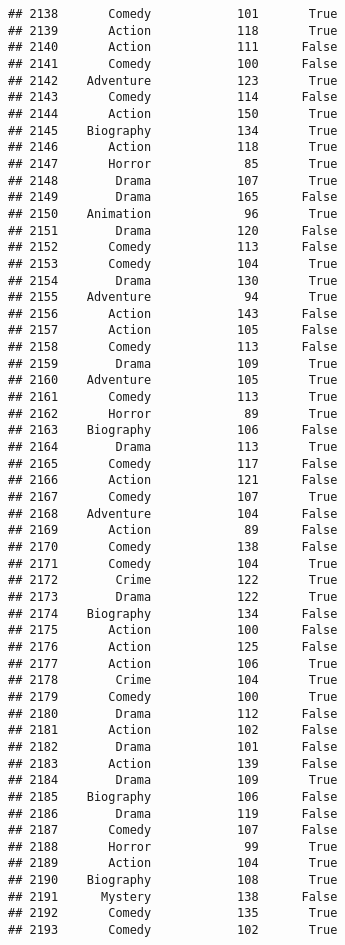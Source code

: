 \documentclass[
]{article}
\begin{document}
\begin{verbatim}
## 2138       Comedy            101       True
## 2139       Action            118       True
## 2140       Action            111      False
## 2141       Comedy            100      False
## 2142    Adventure            123       True
## 2143       Comedy            114      False
## 2144       Action            150       True
## 2145    Biography            134       True
## 2146       Action            118       True
## 2147       Horror             85       True
## 2148        Drama            107       True
## 2149        Drama            165      False
## 2150    Animation             96       True
## 2151        Drama            120      False
## 2152       Comedy            113      False
## 2153       Comedy            104       True
## 2154        Drama            130       True
## 2155    Adventure             94       True
## 2156       Action            143      False
## 2157       Action            105      False
## 2158       Comedy            113      False
## 2159        Drama            109       True
## 2160    Adventure            105       True
## 2161       Comedy            113       True
## 2162       Horror             89       True
## 2163    Biography            106      False
## 2164        Drama            113       True
## 2165       Comedy            117      False
## 2166       Action            121      False
## 2167       Comedy            107       True
## 2168    Adventure            104      False
## 2169       Action             89      False
## 2170       Comedy            138      False
## 2171       Comedy            104       True
## 2172        Crime            122       True
## 2173        Drama            122       True
## 2174    Biography            134      False
## 2175       Action            100      False
## 2176       Action            125      False
## 2177       Action            106       True
## 2178        Crime            104       True
## 2179       Comedy            100       True
## 2180        Drama            112      False
## 2181       Action            102      False
## 2182        Drama            101      False
## 2183       Action            139      False
## 2184        Drama            109       True
## 2185    Biography            106      False
## 2186        Drama            119      False
## 2187       Comedy            107      False
## 2188       Horror             99       True
## 2189       Action            104       True
## 2190    Biography            108       True
## 2191      Mystery            138      False
## 2192       Comedy            135       True
## 2193       Comedy            102       True

\end{verbatim}
\end{document}
